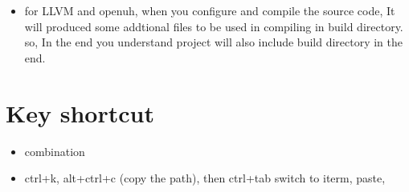 \documentclass[a4paper,11pt,twoside]{book}
\begin{document}
\begin{itemize}
\item for LLVM and openuh, when you configure and compile the source code, It will produced some addtional files to be used in compiling in build directory. so, In the end you understand project will also include build directory in the end. 
  
\end{itemize}
\section{Key shortcut}
\begin{itemize}
	\item combination
	\item ctrl+k, alt+ctrl+c (copy the path), then ctrl+tab switch to iterm, paste, 
	
\end{itemize}
\end{document}
